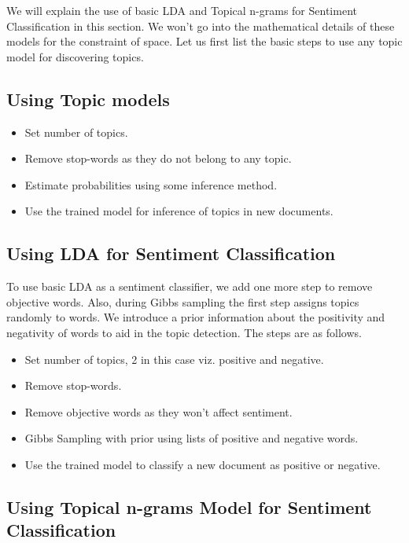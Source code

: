 \documentclass[11pt]{article}
\begin{document}
We will explain the use of basic LDA and Topical n-grams for Sentiment Classification in
this section. We won't go into the mathematical details of these models for the constraint 
of space. Let us first list the basic steps to use any topic model for discovering topics.

\subsection{Using Topic models}

\begin{itemize}
 \itemsep0em
 \item Set number of topics.
 \item Remove stop-words as they do not belong to any topic.
 \item Estimate probabilities using some inference method.
 \item Use the trained model for inference of topics in new documents.
\end{itemize}

\subsection{Using LDA for Sentiment Classification}

To use basic LDA as a sentiment classifier, we add one more step to remove objective words.
Also, during Gibbs sampling the first step assigns topics randomly to words. We introduce
a prior information about the positivity and negativity of words to aid in the topic
detection. The steps are as follows.

\begin{itemize}
 \itemsep0em
 \item Set number of topics, 2 in this case viz. positive and negative.
 \item Remove stop-words.
 \item Remove objective words as they won't affect sentiment.
 \item Gibbs Sampling with prior using lists of positive and negative words.
 \item Use the trained model to classify a new document as positive or negative.
\end{itemize}

\subsection{Using Topical n-grams Model for Sentiment Classification}
\end{document}
